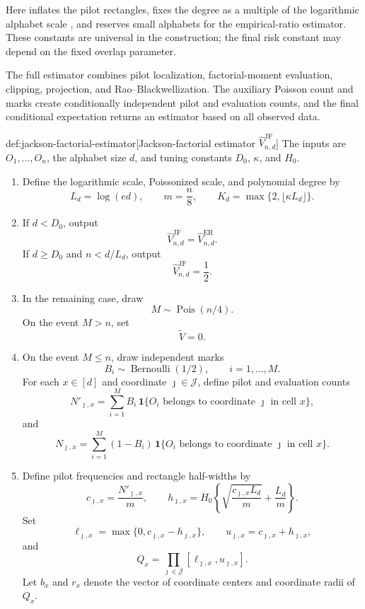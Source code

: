 Here  inflates the pilot rectangles,  fixes the degree as a multiple of the logarithmic alphabet scale , and  reserves small alphabets for the empirical-ratio estimator. These constants are universal in the construction; the final risk constant may depend on the fixed overlap parameter.

The full estimator combines pilot localization, factorial-moment evaluation, clipping, projection, and Rao--Blackwellization. The auxiliary Poisson count  and marks  create conditionally independent pilot and evaluation counts, and the final conditional expectation returns an estimator based on all observed data.

\begin{algorithmv}{def:jackson-factorial-estimator}[Jackson-factorial estimator \(\widehat V_{n,d}^{\mathrm{JF}}\)]
The inputs are \(O_1,\ldots,O_n\), the alphabet size \(d\), and tuning constants \(D_0\), \(\kappa\), and \(H_0\).

\begin{enumerate}
\item Define the logarithmic scale, Poissonized scale, and polynomial degree by
\[
L_d=\log(ed),
\qquad
m=\frac n8,
\qquad
K_d=\max\{2,\lfloor \kappa L_d\rfloor\}.
\]

\item If \(d<D_0\), output
\[
\widehat V_{n,d}^{\mathrm{JF}}
=
\widehat V_{n,d}^{\mathrm{ER}}.
\]
If \(d\ge D_0\) and \(n<d/L_d\), output
\[
\widehat V_{n,d}^{\mathrm{JF}}
=
\frac12.
\]

\item In the remaining case, draw
\[
M\sim\operatorname{Pois}(n/4).
\]
On the event \(M>n\), set
\[
\widetilde V=0.
\]

\item On the event \(M\le n\), draw independent marks
\[
B_i\sim\operatorname{Bernoulli}(1/2),
\qquad i=1,\ldots,M.
\]
For each \(x\in[d]\) and coordinate \(\jmath\in\mathcal J\), define pilot and evaluation counts
\[
N'_{\jmath,x}
=
\sum_{i=1}^M B_i\,\mathbf 1\{O_i\text{ belongs to coordinate }\jmath\text{ in cell }x\},
\]
and
\[
N_{\jmath,x}
=
\sum_{i=1}^M (1-B_i)\,\mathbf 1\{O_i\text{ belongs to coordinate }\jmath\text{ in cell }x\}.
\]

\item Define pilot frequencies and rectangle half-widths by
\[
c_{\jmath,x}
=
\frac{N'_{\jmath,x}}{m},
\qquad
h_{\jmath,x}
=
H_0
\left\{
\sqrt{\frac{c_{\jmath,x}L_d}{m}}
+
\frac{L_d}{m}
\right\}.
\]
Set
\[
\ell_{\jmath,x}
=
\max\{0,c_{\jmath,x}-h_{\jmath,x}\},
\qquad
u_{\jmath,x}
=
c_{\jmath,x}+h_{\jmath,x},
\]
and
\[
Q_x
=
\prod_{\jmath\in\mathcal J}
[\ell_{\jmath,x},u_{\jmath,x}].
\]
Let \(b_x\) and \(r_x\) denote the vector of coordinate centers and coordinate radii of \(Q_x\).


\end{enumerate}
\end{algorithmv}
